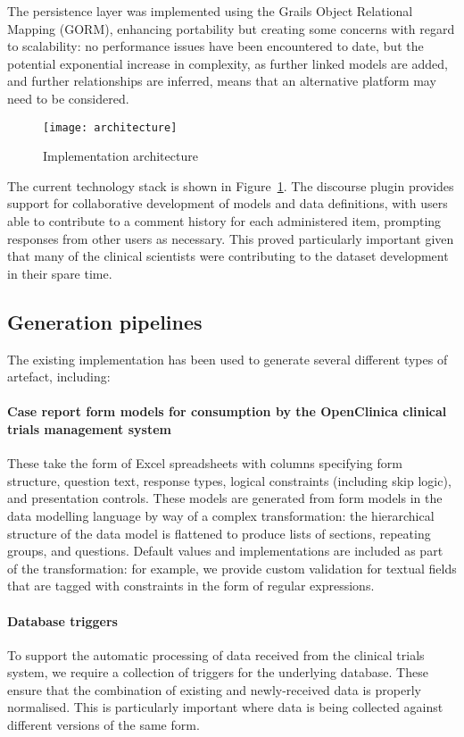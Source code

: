 The persistence layer was implemented using the Grails Object
Relational Mapping (GORM), enhancing portability but creating some
concerns with regard to scalability: no performance issues have been
encountered to date, but the potential exponential increase in
complexity, as further linked models are added, and further
relationships are inferred, means that an alternative platform may
need to be considered. 

\begin{figure}[here]
  \centering
  \texttt{[image: architecture]}
  \caption{Implementation architecture}
  \label{fig:architecture}
\end{figure}

The current technology stack is shown in
Figure~\ref{fig:architecture}.  The discourse plugin provides support
for collaborative development of models and data definitions, with
users able to contribute to a comment history for each administered
item, prompting responses from other users as necessary.  This proved
particularly important given that many of the clinical scientists were
contributing to the dataset development in their spare time. 

\subsection{Generation pipelines}

The existing implementation has been used to generate several
different types of artefact, including:

\paragraph{Case report form models for consumption by the OpenClinica
  clinical trials management system}  These take the form of Excel
spreadsheets with columns specifying form structure, question text,
response types, logical constraints (including skip logic), and
presentation controls.  These models are generated from form models in
the data modelling language by way of a complex transformation: the
hierarchical structure of the data model is flattened to produce lists
of sections, repeating groups, and questions.  Default values and
implementations are included as part of the transformation: for
example, we provide custom validation for textual fields that are
tagged with constraints in the form of regular expressions.

\paragraph{Database triggers} To support the automatic processing of
data received from the clinical trials system, we require a collection
of triggers for the underlying database.  These ensure that the
combination of existing and newly-received data is properly
normalised.  This is particularly important where data is being
collected against different versions of the same form.

